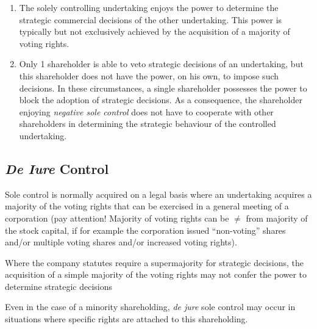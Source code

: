         \begin{enumerate}
            \item The solely controlling undertaking enjoys the power to determine the strategic commercial decisions of the other undertaking. This power is typically but not exclusively achieved by the acquisition of a majority of voting rights.
            \item Only 1 shareholder is able to veto strategic decisions of an undertaking, but this shareholder does not have the power, on his own, to impose such decisions. In these circumstances, a single shareholder possesses the power to block the adoption of strategic decisions. As a consequence, the shareholder enjoying \textit{negative sole control} does not have to cooperate with other shareholders in determining the strategic behaviour of the controlled undertaking.

                
        \end{enumerate}

    \subsection{\textit{De Iure} Control}

        Sole control is normally acquired on a legal basis where an undertaking acquires a majority of the voting rights that can be exercised in a general meeting of a corporation (pay attention! Majority of voting rights can be $\neq$ from majority of the stock capital, if for example the corporation issued “non-voting” shares and/or multiple voting shares and/or increased voting rights).
        
        Where the company statutes require a supermajority for strategic decisions, the acquisition of a simple majority of the voting rights may not confer the power to determine strategic decisions

            
        Even in the case of a minority shareholding, \textit{de jure} sole control may occur in situations where specific rights are attached to this shareholding.


